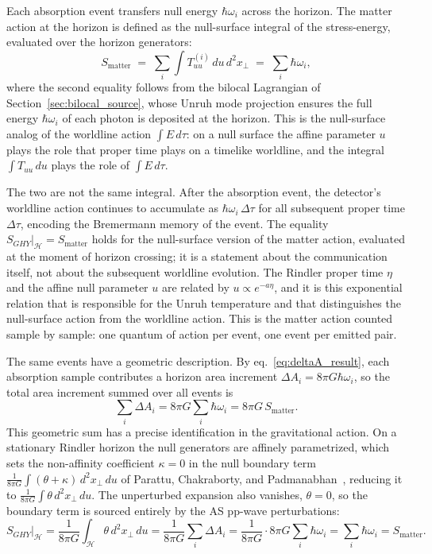 \documentclass[12pt,a4paper]{article}
\begin{document}
Each absorption event transfers null energy $\hbar\omega_i$ across 
the horizon. The matter action at the horizon is defined as the 
null-surface integral of the stress-energy, evaluated over the 
horizon generators:
%
\begin{equation}
S_{\text{matter}} 
\;=\; \sum_i \int T_{uu}^{(i)}\,du\,d^2x_\perp 
\;=\; \sum_i \hbar\omega_i,
\end{equation}
%
where the second equality follows from the bilocal 
Lagrangian of Section~\ref{sec:bilocal_source}, whose 
Unruh mode projection ensures the full energy $\hbar\omega_i$ 
of each photon is deposited at the horizon.
This is the null-surface analog of 
the worldline action $\int E\,d\tau$: on a null surface the 
affine parameter $u$ plays the role that proper time plays 
on a timelike worldline, and the integral $\int T_{uu}\,du$ 
plays the role of $\int E\,d\tau$. 

The two are not the same integral. After the absorption event, 
the detector's worldline action continues to accumulate as 
$\hbar\omega_i\,\Delta\tau$ for all subsequent proper time 
$\Delta\tau$, encoding the Bremermann memory of the event. 
The equality $S_{GHY}|_{\mathcal{H}} = S_{\text{matter}}$ 
holds for the null-surface version of the matter action, 
evaluated at the moment of horizon crossing; it is a statement 
about the communication itself, not about the subsequent 
worldline evolution. The Rindler proper time $\eta$ and the 
affine null parameter $u$ are related by $u \propto e^{-a\eta}$, 
and it is this exponential relation that is responsible for the Unruh 
temperature and that distinguishes the null-surface action 
from the worldline action. This is the 
matter action counted sample by sample: one quantum of action 
per event, one event per emitted pair.

The same events have a geometric description. By 
eq.~\eqref{eq:deltaA_result}, each absorption sample contributes 
a horizon area increment $\Delta A_i = 8\pi G\hbar\omega_i$, so 
the total area increment summed over all events is
%
\begin{equation}
\sum_i \Delta A_i = 8\pi G \sum_i \hbar\omega_i = 8\pi G\, 
S_{\text{matter}}.
\end{equation}
%
This geometric sum has a precise identification in the 
gravitational action.
On a stationary Rindler horizon the null generators are 
affinely parametrized, which sets the non-affinity 
coefficient $\kappa = 0$ in the null boundary term 
$\frac{1}{8\pi G}\int(\theta + \kappa)\,d^2x_\perp\,du$ 
of Parattu, Chakraborty, and 
Padmanabhan~\cite{parattu2016boundary, 
chakraborty2020boundary}, reducing it to 
$\frac{1}{8\pi G}\int\theta\,d^2x_\perp\,du$. 
The unperturbed expansion also vanishes, $\theta = 0$, 
so the boundary term is sourced entirely by the AS 
pp-wave perturbations:
%
\begin{equation}
S_{GHY}\big|_{\mathcal{H}} 
= \frac{1}{8\pi G}\int_{\mathcal{H}} \theta\, d^2x_\perp\, du 
= \frac{1}{8\pi G}\sum_i \Delta A_i 
= \frac{1}{8\pi G} \cdot 8\pi G\sum_i \hbar\omega_i 
= \sum_i \hbar\omega_i
= S_{\text{matter}}.
\label{eq:GHY_micro}
\end{equation}
\end{document}
